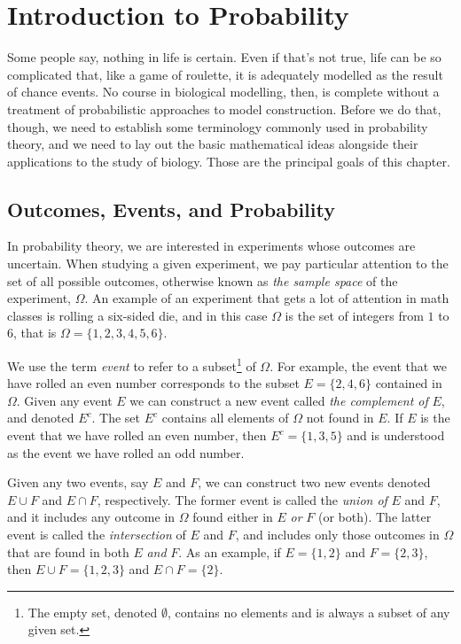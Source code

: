 \documentclass[../book.tex]{subfiles}
\begin{document}
\chapter{Introduction to Probability}\label{ch:prob}

Some people say, nothing in life is certain. Even if that's not true, life can be so complicated that, like a game of roulette, it is adequately modelled as the result of chance events. No course in biological modelling, then, is complete without a treatment of probabilistic approaches to model construction. Before we do that, though, we need to establish some  terminology commonly used in probability theory, and we need to lay out the basic mathematical ideas alongside their applications to the study of biology. Those are the principal goals of this chapter.

\section{Outcomes, Events, and Probability}

In probability theory, we are interested in experiments whose outcomes are uncertain. When studying a given experiment, we pay particular attention to the set of all possible outcomes, otherwise known as \emph{the sample space} of the experiment, \(\Omega\). An example of an experiment that gets a lot of attention in math classes is rolling a six-sided die, and in this case \(\Omega\) is the set of integers from \(1\) to \(6\), that is \(\Omega = \{ 1, 2, 3, 4, 5, 6\}\).

We use the term \emph{event} to refer to a subset\footnote{The empty set, denoted \(\emptyset\), contains no elements and is always a subset of any given set.} of \(\Omega\). For example, the event that we have rolled an even number corresponds to the subset \(E=\{ 2,4,6\}\) contained in \(\Omega\). Given any event \(E\) we can construct a new event called \emph{the complement of} \(E\), and denoted \(E^c\). The set \(E^c\) contains all elements of \(\Omega\) not found in \(E\). If \(E\) is the event that we have rolled an even number, then \(E^c = \{ 1,3,5\}\) and is understood as the event we have rolled an odd number.

Given any two events, say \(E\) and \(F\), we can construct two new events denoted \(E\cup F\) and \(E\cap F\), respectively. The former event is called the \emph{union of} \(E\) and \(F\), and it includes any outcome in \(\Omega\) found either in \(E\) \emph{or} \(F\) (or both). The latter event is called the \emph{intersection} of \(E\) and \(F\), and includes only those outcomes in \(\Omega\) that are found in both \(E\) \emph{and} \(F\). As an example, if \(E=\{1,2\}\) and \(F=\{2,3\}\), then \(E\cup F = \{1,2,3\}\) and \(E\cap F =\{ 2\}\).
\end{document}
